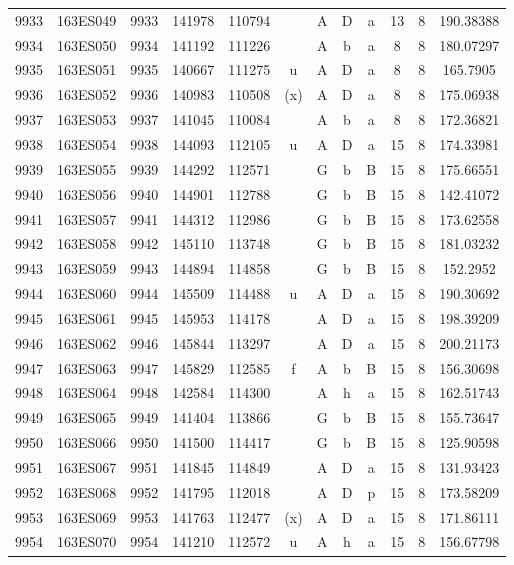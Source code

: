 \begin{tabular}{|*{12}{c|}}
9933 & 163ES049 & 9933 & 141978 & 110794 &  & A & D & a & 13 & 8 & 190.38388 \\ 
9934 & 163ES050 & 9934 & 141192 & 111226 &  & A & b & a & 8 & 8 & 180.07297 \\ 
9935 & 163ES051 & 9935 & 140667 & 111275 & u & A & D & a & 8 & 8 & 165.7905 \\ 
9936 & 163ES052 & 9936 & 140983 & 110508 & (x) & A & D & a & 8 & 8 & 175.06938 \\ 
9937 & 163ES053 & 9937 & 141045 & 110084 &  & A & b & a & 8 & 8 & 172.36821 \\ 
9938 & 163ES054 & 9938 & 144093 & 112105 & u & A & D & a & 15 & 8 & 174.33981 \\ 
9939 & 163ES055 & 9939 & 144292 & 112571 &  & G & b & B & 15 & 8 & 175.66551 \\ 
9940 & 163ES056 & 9940 & 144901 & 112788 &  & G & b & B & 15 & 8 & 142.41072 \\ 
9941 & 163ES057 & 9941 & 144312 & 112986 &  & G & b & B & 15 & 8 & 173.62558 \\ 
9942 & 163ES058 & 9942 & 145110 & 113748 &  & G & b & B & 15 & 8 & 181.03232 \\ 
9943 & 163ES059 & 9943 & 144894 & 114858 &  & G & b & B & 15 & 8 & 152.2952 \\ 
9944 & 163ES060 & 9944 & 145509 & 114488 & u & A & D & a & 15 & 8 & 190.30692 \\ 
9945 & 163ES061 & 9945 & 145953 & 114178 &  & A & D & a & 15 & 8 & 198.39209 \\ 
9946 & 163ES062 & 9946 & 145844 & 113297 &  & A & D & a & 15 & 8 & 200.21173 \\ 
9947 & 163ES063 & 9947 & 145829 & 112585 & f & A & b & B & 15 & 8 & 156.30698 \\ 
9948 & 163ES064 & 9948 & 142584 & 114300 &  & A & h & a & 15 & 8 & 162.51743 \\ 
9949 & 163ES065 & 9949 & 141404 & 113866 &  & G & b & B & 15 & 8 & 155.73647 \\ 
9950 & 163ES066 & 9950 & 141500 & 114417 &  & G & b & B & 15 & 8 & 125.90598 \\ 
9951 & 163ES067 & 9951 & 141845 & 114849 &  & A & D & a & 15 & 8 & 131.93423 \\ 
9952 & 163ES068 & 9952 & 141795 & 112018 &  & A & D & p & 15 & 8 & 173.58209 \\ 
9953 & 163ES069 & 9953 & 141763 & 112477 & (x) & A & D & a & 15 & 8 & 171.86111 \\ 
9954 & 163ES070 & 9954 & 141210 & 112572 & u & A & h & a & 15 & 8 & 156.67798 \\ 

\end{tabular}
